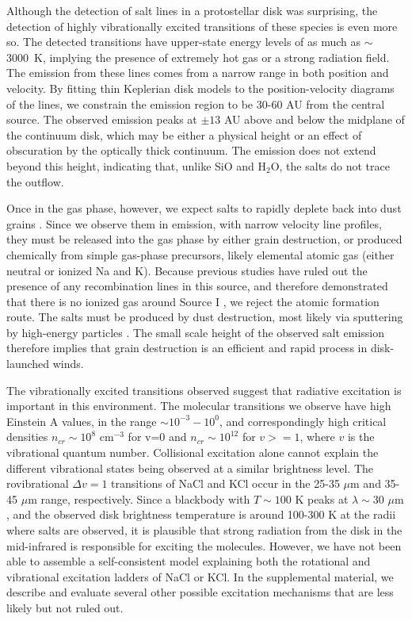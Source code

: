 \documentclass[12pt]{article}
\newcommand{\water}{H$_{2}$O\xspace}		%
\newcommand{\percc}{\ensuremath{\textrm{cm}^{-3}}\xspace}
\newcommand{\um}{\ensuremath{\mu \textrm{m}}\xspace}    %
\begin{document}
Although the detection of salt lines in a protostellar disk was surprising,
the detection of highly vibrationally excited transitions of these species is
even more so.  The detected transitions have upper-state energy levels of as much as 
$\sim$3000~K, implying the presence of extremely hot gas or a strong radiation
field. The emission from these lines comes from a narrow range in both position
and velocity.  By fitting thin Keplerian disk models to the position-velocity
diagrams of the lines, we constrain the emission region to be 30-60 AU from
the central source.  The observed emission peaks at $\pm13$ AU above and below
the midplane of the continuum disk, which may be either a physical height or an
effect of obscuration by the optically thick continuum.  The emission does not
extend beyond this height, indicating that, unlike SiO and \water, the salts do
not trace the outflow.

Once in the gas phase, however, we expect salts to rapidly deplete back into
dust grains \cite{Cherncheff2012a}.  Since we observe them in emission, with
narrow velocity line profiles, they
must be released into the gas phase by either grain destruction, or produced
chemically from simple gas-phase precursors, likely elemental atomic gas
(either neutral or ionized Na and K).  Because previous studies have ruled out
the presence of any recombination lines in this source, and therefore
demonstrated that there is no ionized gas around Source I
\cite{Plambeck2016a,Baez-Rubio2018a}, we reject the atomic formation route.
The salts must be produced by dust destruction, most likely via sputtering by
high-energy particles \cite{Schilke1997a}.  The small scale height of the
observed salt emission therefore implies that grain destruction is an efficient
and rapid process in disk-launched winds.

The vibrationally excited transitions observed suggest that radiative
excitation is important in this environment.  The molecular transitions we
observe have high Einstein A values, in the range $\sim10^{-3}-10^0$, and
correspondingly high critical densities $n_{cr} \sim10^{8}$ \percc for v=0
and $n_{cr} \sim 10^{12}$ for $v>=1$, where $v$
is the vibrational quantum number.  Collisional excitation alone cannot explain
the different vibrational states being observed at a similar brightness level.
The rovibrational $\Delta v=1$ transitions of NaCl and KCl occur in the 25-35
\um and 35-45 \um range, respectively.  Since a blackbody with $T\sim100$ K
peaks at $\lambda\sim30$ \um, and the observed disk brightness temperature is
around 100-300 K at the radii where salts are observed, it is plausible that
strong radiation from the disk in the mid-infrared is responsible for exciting
the molecules.  However, we have not been able to assemble a self-consistent
model explaining both the rotational and vibrational excitation ladders of NaCl
or KCl.  In the supplemental material, we describe  and evaluate several other
possible excitation mechanisms that are less likely but not ruled out.
\end{document}
